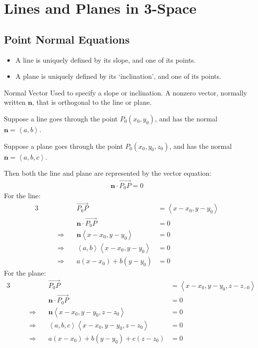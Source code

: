 \documentclass[\main/notes.tex]{subfiles}
\begin{document}
		\section{Lines and Planes in 3-Space}
			\subsection{Point Normal Equations}
				\begin{itemize}
					\item A line is uniquely defined by its slope, and one of its points.
					\item A plane is uniquely defined by its `inclination', and one of its points.
				\end{itemize}
				\begin{definition}{Normal Vector}
					Used to specify a slope or inclination. A nonzero vector, normally written $\mathbf{n}$, that is orthogonal to the line or plane.
				\end{definition}
				\begin{example}
					Suppose a line goes through the point $P_{0}(x_{0}, y_{0})$, and has the normal $\mathbf{n} = \left\langle a, b\right\rangle$.

					Suppose a plane goes through the point $P_{0}(x_{0}, y_{0}, z_{0})$, and has the normal $\mathbf{n} = \left\langle a, b, c\right\rangle$.

					Then both the line and plane are represented by the vector equation:
					\begin{align*}
						\mathbf{n} \cdot \overrightarrow{P_{0}P} = 0
					\end{align*}
					For the line:
					\begin{alignat*}{3}
						& & \overrightarrow{P_{0}P} &= \left\langle x - x_{0}, y - y_{0}\right\rangle\\
						& &\mathbf{n} \cdot \overrightarrow{P_{0}P} &= 0\\
						& \qquad \Rightarrow \quad &\mathbf{n} \left\langle x - x_{0}, y - y_{0}\right\rangle &= 0\\
						& \qquad \Rightarrow \quad& \left\langle a, b\right\rangle \left\langle x - x_{0}, y - y_{0}\right\rangle &= 0\\
						& \qquad \Rightarrow \quad & a(x - x_{0}) + b(y - y_{0}) &= 0
					\end{alignat*}
					For the plane:
					\begin{alignat*}{3}
						& & \overrightarrow{P_{0}P} &= \left\langle x - x_{0}, y - y_{0}, z - z_{-0}\right\rangle\\
						& &\mathbf{n} \cdot \overrightarrow{P_{0}P} &= 0\\
						& \qquad \Rightarrow \quad &\mathbf{n} \left\langle x - x_{0}, y - y_{0}, z - z_{0}\right\rangle &= 0\\
						& \qquad \Rightarrow \quad & \left\langle a, b, c\right\rangle \left\langle x - x_{0}, y - y_{0}, z - z_{0}\right\rangle &= 0\\
						& \qquad \Rightarrow \quad & a(x - x_{0}) + b(y - y_{0}) + c(z - z_{0}) &= 0
					\end{alignat*}
				\end{example}
\end{document}
